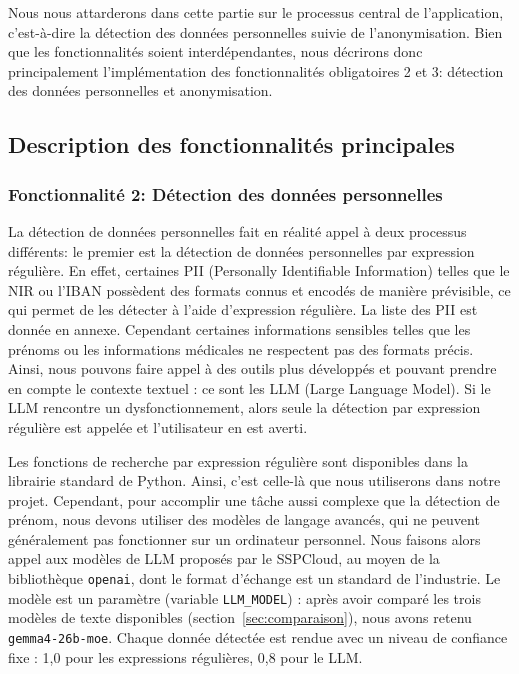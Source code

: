\documentclass[12pt,a4paper]{article}
\begin{document}
Nous nous attarderons dans cette partie sur le processus central de l’application, c’est-à-dire la détection des données personnelles suivie de l’anonymisation. Bien que les fonctionnalités soient interdépendantes, nous décrirons donc principalement l’implémentation des fonctionnalités obligatoires 2 et 3: détection des données personnelles et anonymisation.

\subsection{Description des fonctionnalités principales}

\subsubsection{Fonctionnalité 2: Détection des données personnelles}

La détection de données personnelles fait en réalité appel à deux processus différents: le premier est la détection de données personnelles par expression régulière. En effet, certaines PII (Personally Identifiable Information) telles que le NIR ou l’IBAN  possèdent des formats connus et encodés de manière prévisible,  ce qui permet  de les détecter à l'aide d'expression régulière. La liste des  PII  est donnée en  annexe. Cependant certaines informations sensibles telles que les prénoms ou les informations médicales ne respectent pas des formats précis. Ainsi, nous pouvons faire appel à des outils plus développés et  pouvant prendre  en compte le contexte  textuel : ce sont les LLM (Large Language Model). Si le LLM rencontre un dysfonctionnement, alors seule la détection par expression régulière est appelée et l’utilisateur en est averti.

Les fonctions de recherche par expression régulière sont disponibles dans la librairie standard de Python. Ainsi, c'est celle-là que nous utiliserons dans notre projet. Cependant, pour accomplir une tâche aussi complexe que la détection de prénom, nous devons utiliser des modèles de langage avancés, qui ne peuvent généralement pas fonctionner sur un ordinateur personnel. Nous faisons alors appel aux modèles de LLM proposés par le SSPCloud, au moyen de la bibliothèque \texttt{openai}, dont le format d'échange est un standard de l’industrie. Le modèle est un paramètre (variable \texttt{LLM\_MODEL}) : après avoir comparé les trois modèles de texte disponibles (section~\ref{sec:comparaison}), nous avons retenu \texttt{gemma4-26b-moe}. Chaque donnée détectée est rendue avec un niveau de confiance fixe : 1,0 pour les expressions régulières, 0,8 pour le LLM.
\end{document}
